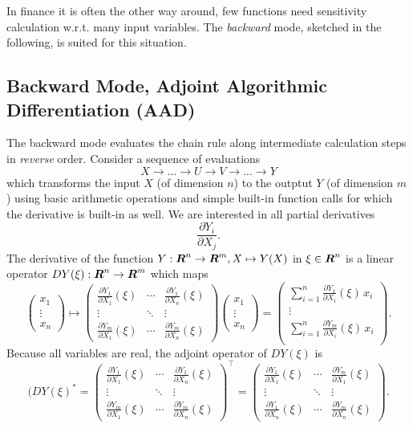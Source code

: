 In finance it is often the other way around, few
functions need sensitivity calculation w.r.t. many input variables.
The {\em backward} mode, sketched in the following, is
suited for this situation.

\subsection*{Backward Mode, Adjoint Algorithmic Differentiation (AAD)}
The backward mode evaluates the chain rule along
intermediate calculation steps in {\em reverse} order.
Consider a sequence of evaluations \cite{capriotti_2011c}
$$
X \rightarrow ... \rightarrow U \rightarrow V \rightarrow
... \rightarrow Y
$$
which transforms the input $X$ (of dimension $n$) to the outptut $Y$
(of dimension $m$) using basic arithmetic operations and simple
built-in function calls for which the derivative is built-in as well.
We are interested in all partial derivatives
$$
\frac{\partial Y_i}{\partial X_j}.
$$
The derivative of the function $Y: {\boldsymbol{R}}^n \to {\boldsymbol{R}}^m, X\mapsto Y(X)$ in $\xi\in{\boldsymbol{R}}^n$ is a linear operator $DY(\xi): {\boldsymbol{R}}^n\to{\boldsymbol{R}}^m$ which maps
$$
\left(\begin{matrix}
x_1\\
\vdots\\
x_n
\end{matrix}\right)
 \mapsto
\left( \begin{matrix}
\frac{\partial Y_1}{\partial X_1}(\xi) & \cdots & \frac{\partial Y_1}{\partial X_n}(\xi)\\
\vdots & \ddots & \vdots\\
\frac{\partial Y_m}{\partial X_1}(\xi) & \cdots & \frac{\partial Y_m}{\partial X_n}(\xi)
\end{matrix}\right) \!
\left(\begin{matrix}
x_1\\
\vdots\\
x_n
\end{matrix}\right)
= \left(\begin{matrix}
\sum_{i=1}^n \frac{\partial Y_1}{\partial X_i}(\xi)\,x_i\\
\vdots\\
\sum_{i=1}^n \frac{\partial Y_m}{\partial X_i}(\xi)\,x_i\\
\end{matrix}\right) \!.$$
Because all variables are real, the adjoint operator of $DY(\xi)$ is
$$(DY(\xi)^* = \left( \begin{matrix}
\frac{\partial Y_1}{\partial X_1}(\xi) & \cdots & \frac{\partial Y_1}{\partial X_n}(\xi)\\
\vdots & \ddots & \vdots\\
\frac{\partial Y_m}{\partial X_1}(\xi) & \cdots & \frac{\partial Y_m}{\partial X_n}(\xi)
\end{matrix}\right)^{\top} \!=
\left( \begin{matrix}
\frac{\partial Y_1}{\partial X_1}(\xi) & \cdots & \frac{\partial Y_m}{\partial X_1}(\xi)\\
\vdots & \ddots & \vdots\\
\frac{\partial Y_1}{\partial X_n}(\xi) & \cdots & \frac{\partial Y_m}{\partial X_n}(\xi)
\end{matrix}\right).
$$
